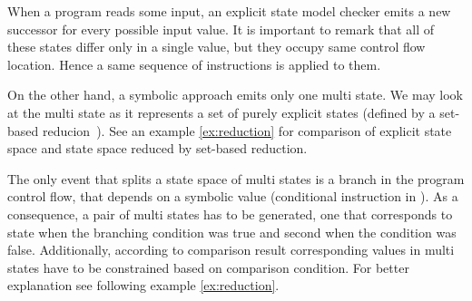 When a program reads some input, an explicit state model checker emits a
new successor for every possible input value. It is important to remark that all of
these states differ only in a single value, but they occupy same control flow
location. Hence a same sequence of instructions is applied to them.


On the other hand, a symbolic approach emits only one multi state. We may look at the multi state as it represents a set of purely explicit states (defined by
a set-based reducion~\cite{Havel14}). See an example \ref{ex:reduction} for comparison of
explicit state space and state space reduced by set-based reduction.

The only event that splits a state space of multi states is a branch in the
program control flow, that depends on a symbolic value (conditional 
instruction in \LLVM). As a consequence, a pair of multi states has to be
generated, one that corresponds to state when the branching condition was true and
second when the condition was false. Additionally, according to comparison result
corresponding values in multi states have to be constrained based on comparison
condition. For better explanation see following example \ref{ex:reduction}.

